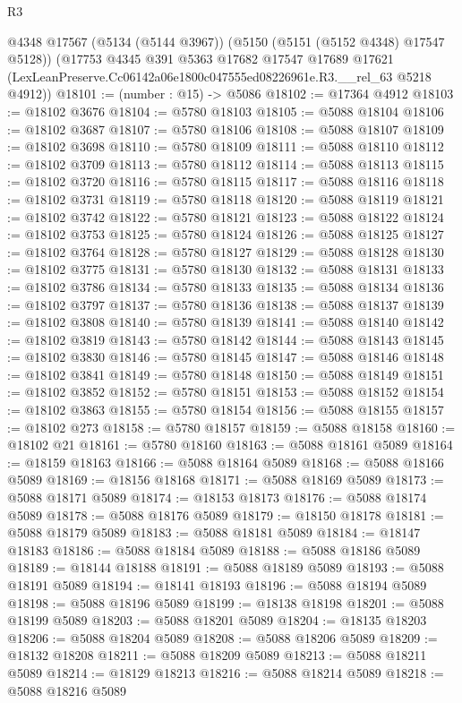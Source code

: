 \begin{lexlean}{R3}
\begin{coremodule}
    @4348
    @17567
    (@5134 (@5144 @3967))
    (@5150 (@5151 (@5152 @4348) @17547 @5128))
    (@17753
      @4345
      @391
      @5363
      @17682
      @17547
      @17689
      @17621
      (LexLeanPreserve.Cc06142a06e1800c047555ed08226961e.R3.__rel_63 @5218 @4912))
@18101 := (number : @15) -> @5086
@18102 := @17364 @4912
@18103 := @18102 @3676
@18104 := @5780 @18103
@18105 := @5088 @18104
@18106 := @18102 @3687
@18107 := @5780 @18106
@18108 := @5088 @18107
@18109 := @18102 @3698
@18110 := @5780 @18109
@18111 := @5088 @18110
@18112 := @18102 @3709
@18113 := @5780 @18112
@18114 := @5088 @18113
@18115 := @18102 @3720
@18116 := @5780 @18115
@18117 := @5088 @18116
@18118 := @18102 @3731
@18119 := @5780 @18118
@18120 := @5088 @18119
@18121 := @18102 @3742
@18122 := @5780 @18121
@18123 := @5088 @18122
@18124 := @18102 @3753
@18125 := @5780 @18124
@18126 := @5088 @18125
@18127 := @18102 @3764
@18128 := @5780 @18127
@18129 := @5088 @18128
@18130 := @18102 @3775
@18131 := @5780 @18130
@18132 := @5088 @18131
@18133 := @18102 @3786
@18134 := @5780 @18133
@18135 := @5088 @18134
@18136 := @18102 @3797
@18137 := @5780 @18136
@18138 := @5088 @18137
@18139 := @18102 @3808
@18140 := @5780 @18139
@18141 := @5088 @18140
@18142 := @18102 @3819
@18143 := @5780 @18142
@18144 := @5088 @18143
@18145 := @18102 @3830
@18146 := @5780 @18145
@18147 := @5088 @18146
@18148 := @18102 @3841
@18149 := @5780 @18148
@18150 := @5088 @18149
@18151 := @18102 @3852
@18152 := @5780 @18151
@18153 := @5088 @18152
@18154 := @18102 @3863
@18155 := @5780 @18154
@18156 := @5088 @18155
@18157 := @18102 @273
@18158 := @5780 @18157
@18159 := @5088 @18158
@18160 := @18102 @21
@18161 := @5780 @18160
@18163 := @5088 @18161 @5089
@18164 := @18159 @18163
@18166 := @5088 @18164 @5089
@18168 := @5088 @18166 @5089
@18169 := @18156 @18168
@18171 := @5088 @18169 @5089
@18173 := @5088 @18171 @5089
@18174 := @18153 @18173
@18176 := @5088 @18174 @5089
@18178 := @5088 @18176 @5089
@18179 := @18150 @18178
@18181 := @5088 @18179 @5089
@18183 := @5088 @18181 @5089
@18184 := @18147 @18183
@18186 := @5088 @18184 @5089
@18188 := @5088 @18186 @5089
@18189 := @18144 @18188
@18191 := @5088 @18189 @5089
@18193 := @5088 @18191 @5089
@18194 := @18141 @18193
@18196 := @5088 @18194 @5089
@18198 := @5088 @18196 @5089
@18199 := @18138 @18198
@18201 := @5088 @18199 @5089
@18203 := @5088 @18201 @5089
@18204 := @18135 @18203
@18206 := @5088 @18204 @5089
@18208 := @5088 @18206 @5089
@18209 := @18132 @18208
@18211 := @5088 @18209 @5089
@18213 := @5088 @18211 @5089
@18214 := @18129 @18213
@18216 := @5088 @18214 @5089
@18218 := @5088 @18216 @5089

\end{coremodule}
\end{lexlean}
